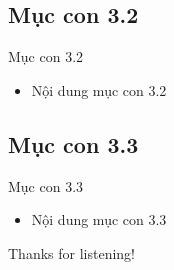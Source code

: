 \documentclass{beamer}
\begin{document}
\subsection{Mục con 3.2}
\begin{frame}{Mục con 3.2}
    \begin{itemize}
        \item Nội dung mục con 3.2
    \end{itemize}
\end{frame}

\subsection{Mục con 3.3}
\begin{frame}{Mục con 3.3}
    \begin{itemize}
        \item Nội dung mục con 3.3
    \end{itemize}
\end{frame}

\begin{frame}{}
    \centering
    \Huge{Thanks for listening!}
\end{frame}
\end{document}
